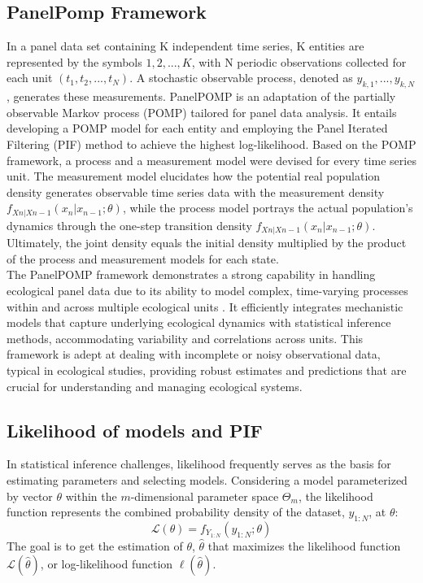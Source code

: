 \documentclass[12pt]{article}
\begin{document}
\subsection{PanelPomp Framework}
In a panel data set containing K independent time series, K entities are represented by the symbols $1,2,...,K$, with N periodic observations collected for each unit $(t_1,t_2,...,t_{N})$. A stochastic observable process, denoted as $y_{k,1},...,y_{k,N}$, generates these measurements. PanelPOMP is an adaptation of the partially observable Markov process (POMP) tailored for panel data analysis. It entails developing a POMP model for each entity and employing the Panel Iterated Filtering (PIF) method to achieve the highest log-likelihood. Based on the POMP framework, a process and a measurement model were devised for every time series unit. The measurement model elucidates how the potential real population density generates observable time series data with the measurement density $f_{Xn|Xn-1}(x_n|x_{n-1};\theta)$, while the process model portrays the actual population's dynamics through the one-step transition density $f_{Xn|Xn-1}(x_n|x_{n-1};\theta)$. Ultimately, the joint density equals the initial density multiplied by the product of the process and measurement models for each state.\\

The PanelPOMP framework demonstrates a strong capability in handling ecological panel data due to its ability to model complex, time-varying processes within and across multiple ecological units \cite{Carles2020}. It efficiently integrates mechanistic models that capture underlying ecological dynamics with statistical inference methods, accommodating variability and correlations across units. This framework is adept at dealing with incomplete or noisy observational data, typical in ecological studies, providing robust estimates and predictions that are crucial for understanding and managing ecological systems.\\


\subsection{Likelihood of models and PIF}

In statistical inference challenges, likelihood frequently serves as the basis for estimating parameters and selecting models. Considering a model parameterized by vector $\theta$ within the $m$-dimensional parameter space $\Theta_m$, the likelihood function represents the combined probability density of the dataset, $y_{1:N}$, at $\theta$:
        \begin{equation}
        \mathcal{L}(\theta) = f_{Y_{1:N}}(y_{1:N}; \theta)
        \end{equation}
The goal is to get the estimation of $\theta$, $\hat{\theta}$ that maximizes the likelihood function $\mathcal{L}(\hat{\theta})$, or log-likelihood function $\mathbf{\ell}(\hat{\theta})$.
\end{document}
